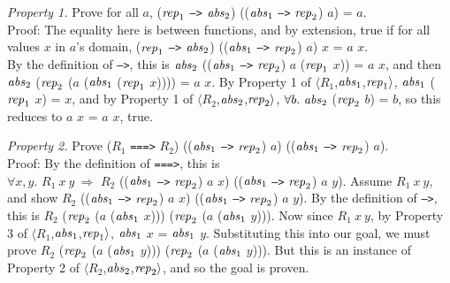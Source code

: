 \documentclass[envcountsame,runningheads]{llncs}
\begin{document}
{\it Property 1.} Prove for all $a$,
(${\it rep}_1$ {\tt -->} ${\it abs}_2$)
((${\it abs}_1$ {\tt -->} ${\it rep}_2$) $a$) = $a$. \\
Proof:
The equality here is between functions, and by extension, true if
for all values $x$ in $a$'s domain,
(${\it rep}_1$ {\tt -->} ${\it abs}_2$)
((${\it abs}_1$ {\tt -->} ${\it rep}_2$) $a$) $x$ = $a$ $x$. \\
By the definition of {\tt -->}, this is
${\it abs}_2$
((${\it abs}_1$ {\tt -->} ${\it rep}_2$) $a$ (${\it rep}_1$ $x$)) = $a$ $x$,
and then
${\it abs}_2$ (${\it rep}_2$ ($a$ (${\it abs}_1$ (${\it rep}_1$ $x$)))) = $a$ $x$.
By Property 1 of $\langle R_1$,${\it abs}_1$,${\it rep}_1 \rangle$,
${\it abs}_1$ (${\it rep}_1$ $x$) = $x$, and
by Property 1 of $\langle R_2$,${\it abs}_2$,${\it rep}_2 \rangle$,
$\forall b.\ {\it abs}_2$ (${\it rep}_2$ $b$) = $b$, so
this reduces to $a$ $x$ = $a$ $x$, true.

{\it Property 2.} Prove
($R_1$ {\tt ===>} $R_2$)
((${\it abs}_1$ {\tt -->} ${\it rep}_2$) $a$)
((${\it abs}_1$ {\tt -->} ${\it rep}_2$) $a$). \\
Proof:
By the definition of {\tt ===>}, this is \\
$\forall x, y.$
$R_1 \ x \ y \ \Rightarrow$ $R_2$
((${\it abs}_1$ {\tt -->} ${\it rep}_2$) $a$ $x$)
((${\it abs}_1$ {\tt -->} ${\it rep}_2$) $a$ $y$).
Assume $R_1 \ x \ y$, and show $R_2$
((${\it abs}_1$ {\tt -->} ${\it rep}_2$) $a$ $x$)
((${\it abs}_1$ {\tt -->} ${\it rep}_2$) $a$ $y$).
By the definition of {\tt -->}, this is $R_2$
(${\it rep}_2$ ($a$ (${\it abs}_1$ $x$)))
(${\it rep}_2$ ($a$ (${\it abs}_1$ $y$))).
Now since $R_1 \ x \ y$, by Property 3 of $\langle R_1$,${\it abs}_1$,${\it rep}_1 \rangle$,
${\it abs}_1$ $x$ = ${\it abs}_1$ $y$.
Substituting this into our goal, we must prove $R_2$
(${\it rep}_2$ ($a$ (${\it abs}_1$ $y$)))
(${\it rep}_2$ ($a$ (${\it abs}_1$ $y$))).
But this is an instance of Property 2 of
$\langle R_2$,${\it abs}_2$,${\it rep}_2 \rangle$, and
so the goal is proven.
\end{document}
